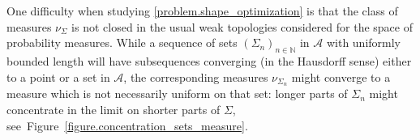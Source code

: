 \documentclass[11pt]{article}
\numberwithin{equation}{section}
\theoremstyle{definition}
\begin{document}
One difficulty when studying \eqref{problem.shape_optimization} is that the class of measures $\nu_\Sigma$ is not closed in the usual weak topologies considered for the space of probability measures.
While a sequence of sets $(\Sigma_{n})_{n\in \mathbb{N}}$ in $\mathcal{A}$ with uniformly bounded length will have subsequences converging (in the Hausdorff sense) either to a point or a set in $\mathcal{A}$, the corresponding measures $\nu_{\Sigma_n}$ might converge to a measure which is not necessarily uniform on that set: longer parts of $\Sigma_n$ might concentrate in the limit on shorter parts of $\Sigma$, see~Figure~\ref{figure.concentration_sets_measure}.
\begin{figure}[t]
\centering

\end{figure}
\end{document}
